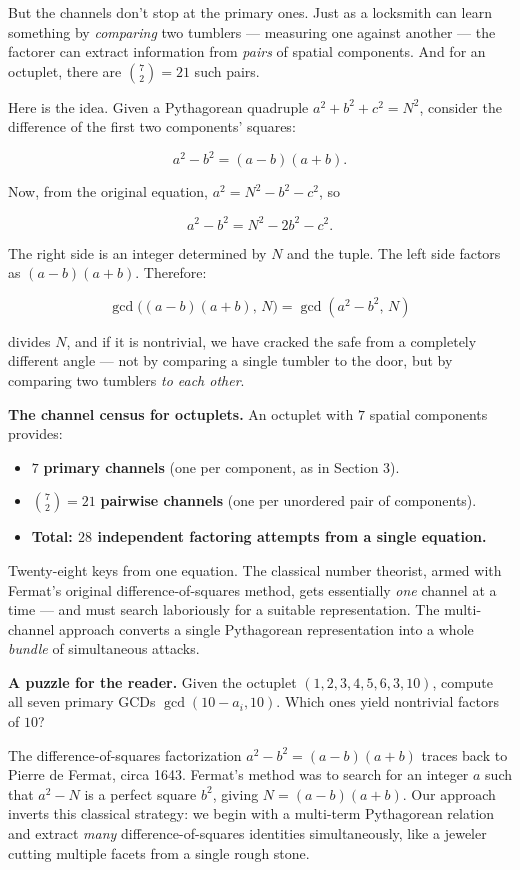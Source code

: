 \documentclass[11pt,twoside,openright]{book}
\theoremstyle{definition}
\theoremstyle{remark}
\begin{document}
But the channels don't stop at the primary ones. Just as a locksmith can learn something by \textit{comparing} two tumblers --- measuring one against another --- the factorer can extract information from \textit{pairs} of spatial components. And for an octuplet, there are $\binom{7}{2} = 21$ such pairs.

Here is the idea. Given a Pythagorean quadruple $a^2 + b^2 + c^2 = N^2$, consider the difference of the first two components' squares:

\[a^2 - b^2 = (a - b)(a + b).\]

Now, from the original equation, $a^2 = N^2 - b^2 - c^2$, so

\[a^2 - b^2 = N^2 - 2b^2 - c^2.\]

The right side is an integer determined by $N$ and the tuple. The left side factors as $(a - b)(a + b)$. Therefore:

\[\gcd\!\big((a - b)(a + b),\, N\big) = \gcd(a^2 - b^2, \, N)\]

divides $N$, and if it is nontrivial, we have cracked the safe from a completely different angle --- not by comparing a single tumbler to the door, but by comparing two tumblers \textit{to each other}.

\textbf{The channel census for octuplets.} An octuplet with $7$ spatial components provides:

\begin{itemize}
  \item $7$ \textbf{primary channels} (one per component, as in Section 3).
  \item $\binom{7}{2} = 21$ \textbf{pairwise channels} (one per unordered pair of components).
  \item \textbf{Total: $28$ independent factoring attempts from a single equation.}
\end{itemize}

Twenty-eight keys from one equation. The classical number theorist, armed with Fermat's original difference-of-squares method, gets essentially \textit{one} channel at a time --- and must search laboriously for a suitable representation. The multi-channel approach converts a single Pythagorean representation into a whole \textit{bundle} of simultaneous attacks.


\textbf{A puzzle for the reader.} Given the octuplet $(1, 2, 3, 4, 5, 6, 3, 10)$, compute all seven primary GCDs $\gcd(10 - a_i, 10)$. Which ones yield nontrivial factors of $10$?

The difference-of-squares factorization $a^2 - b^2 = (a - b)(a + b)$ traces back to Pierre de Fermat, circa 1643. Fermat's method was to search for an integer $a$ such that $a^2 - N$ is a perfect square $b^2$, giving $N = (a - b)(a + b)$. Our approach inverts this classical strategy: we begin with a multi-term Pythagorean relation and extract \textit{many} difference-of-squares identities simultaneously, like a jeweler cutting multiple facets from a single rough stone.
\end{document}
